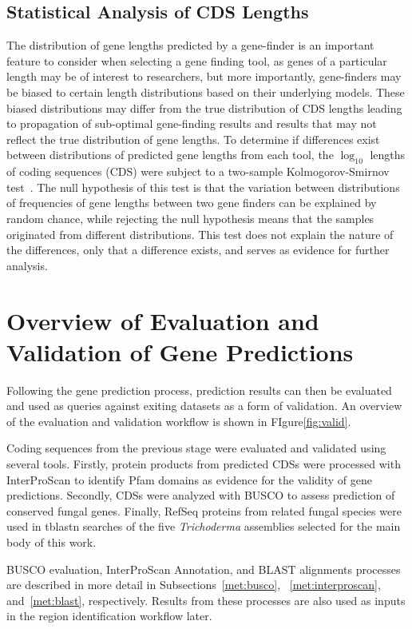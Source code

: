 \subsection{Statistical Analysis of CDS Lengths}\label{met:cds-stats}

The distribution of gene lengths predicted by a gene-finder is an
important feature to consider when selecting a gene finding tool, as
genes of a particular length may be of interest to researchers, but
more importantly, gene-finders may be biased to certain length distributions
based on their underlying models. These
biased distributions may differ from the true distribution of CDS
lengths leading to propagation of sub-optimal gene-finding results and
results that may not reflect the true distribution of gene lengths. To
determine if differences exist between distributions of predicted
gene lengths from each tool, the $\log_{10}$ lengths of coding
sequences (CDS) were subject to a two-sample Kolmogorov-Smirnov
test~\cite{2008}. The null hypothesis of this test is that the variation between distributions of frequencies of gene lengths between two gene finders can be explained by random chance, while rejecting the null hypothesis means that the samples originated from different distributions. This test does not explain the nature of the differences, only that a difference exists, and serves as evidence for further analysis.

\section{Overview of Evaluation and Validation of Gene Predictions}\label{met:valid-workflow}

Following the gene prediction process, prediction results can then be
evaluated and used as queries against exiting datasets as a form of
validation. An overview of the evaluation and validation workflow is shown in FIgure\ref{fig:valid}.

Coding sequences from the previous stage were evaluated and validated
using several tools. Firstly, protein products from predicted CDSs
were processed with InterProScan to identify Pfam domains as evidence
for the validity of gene predictions. Secondly, CDSs were analyzed
with BUSCO to assess prediction of conserved fungal genes. Finally,
RefSeq proteins from related fungal species were used in tblastn
searches of the five \textit{Trichoderma} assemblies selected for the
main body of this work.

BUSCO evaluation, InterProScan Annotation, and BLAST alignments
processes are described in more detail in Subsections~\ref{met:busco},
~\ref{met:interproscan}, and~\ref{met:blast}, respectively. Results
from these processes are also used as inputs in the region
identification workflow later.

